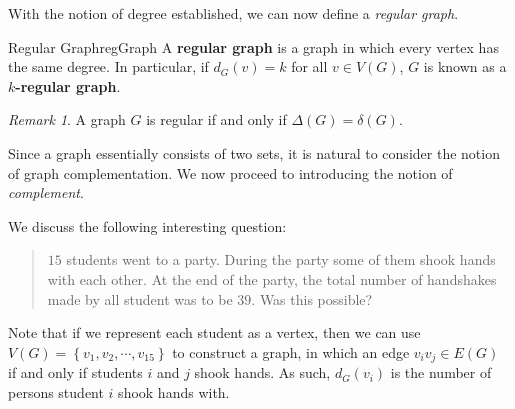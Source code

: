 \documentclass[math]{amznotes}
\makeatletter
\let\save@mathaccent\mathaccent
\newcommand*\if@single[3]{%
  \setbox0\hbox{${\mathaccent"0362{#1}}^H$}%
  \setbox2\hbox{${\mathaccent"0362{\kern0pt#1}}^H$}%
  \ifdim\ht0=\ht2 #3\else #2\fi
  }
\newcommand*\rel@kern[1]{\kern#1\dimexpr\macc@kerna}
\newcommand*\widebar[1]{\@ifnextchar^{{\wide@bar{#1}{0}}}{\wide@bar{#1}{1}}}
\newcommand*\wide@bar[2]{\if@single{#1}{\wide@bar@{#1}{#2}{1}}{\wide@bar@{#1}{#2}{2}}}
\newcommand*\wide@bar@[3]{%
  \begingroup
  \def\mathaccent##1##2{%
    \let\mathaccent\save@mathaccent
    \if#32 \let\macc@nucleus\first@char \fi
    \setbox\z@\hbox{$\macc@style{\macc@nucleus}_{}$}%
    \setbox\tw@\hbox{$\macc@style{\macc@nucleus}{}_{}$}%
    \dimen@\wd\tw@
    \advance\dimen@-\wd\z@
    \divide\dimen@ 3
    \@tempdima\wd\tw@
    \advance\@tempdima-\scriptspace
    \divide\@tempdima 10
    \advance\dimen@-\@tempdima
    \ifdim\dimen@>\z@ \dimen@0pt\fi
    \rel@kern{0.6}\kern-\dimen@
    \if#31
      \overline{\rel@kern{-0.6}\kern\dimen@\macc@nucleus\rel@kern{0.4}\kern\dimen@}%
      \advance\dimen@0.4\dimexpr\macc@kerna
      \let\final@kern#2%
      \ifdim\dimen@<\z@ \let\final@kern1\fi
      \if\final@kern1 \kern-\dimen@\fi
    \else
      \overline{\rel@kern{-0.6}\kern\dimen@#1}%
    \fi
  }%
  \macc@depth\@ne
  \let\math@bgroup\@empty \let\math@egroup\macc@set@skewchar
  \mathsurround\z@ \frozen@everymath{\mathgroup\macc@group\relax}%
  \macc@set@skewchar\relax
  \let\mathaccentV\macc@nested@a
  \if#31
    \macc@nested@a\relax111{#1}%
  \else
    \def\gobble@till@marker##1\endmarker{}%
    \futurelet\first@char\gobble@till@marker#1\endmarker
    \ifcat\noexpand\first@char A\else
      \def\first@char{}%
    \fi
    \macc@nested@a\relax111{\first@char}%
  \fi
  \endgroup
}
\theoremstyle{remark}
\newtheorem*{remark}{Remark}
\newcommand{\0}{\mathbf{0}}
\newcommand{\1}{\mathbf{1}}
\makeatother
\begin{document}
With the notion of degree established, we can now define a \textit{regular graph}.
\begin{dfnbox}{Regular Graph}{regGraph}
    A {\color{red} \textbf{regular graph}} is a graph in which every vertex has the same degree. In particular, if $d_G(v) = k$ for all $v \in V(G)$, $G$ is known as a {\color{red} \textbf{$k$-regular graph}}.
\end{dfnbox}
\begin{notebox}
    \begin{remark}
        A graph $G$ is regular if and only if $\Delta(G) = \delta(G)$.
    \end{remark}
\end{notebox}
Since a graph essentially consists of two sets, it is natural to consider the notion of graph complementation. We now proceed to introducing the notion of \textit{complement}.
We discuss the following interesting question:
\begin{quote}
    $15$ students went to a party. During the party some of them shook hands with each other. At the end of the party, the total number of handshakes made by all student was to be $39$. Was this possible?
\end{quote}
Note that if we represent each student as a vertex, then we can use $V(G) = \left\{v_1, v_2, \cdots, v_{15}\right\}$ to construct a graph, in which an edge $v_iv_j \in E(G)$ if and only if students $i$ and $j$ shook hands. As such, $d_G(v_i)$ is the number of persons student $i$ shook hands with.
\end{document}
